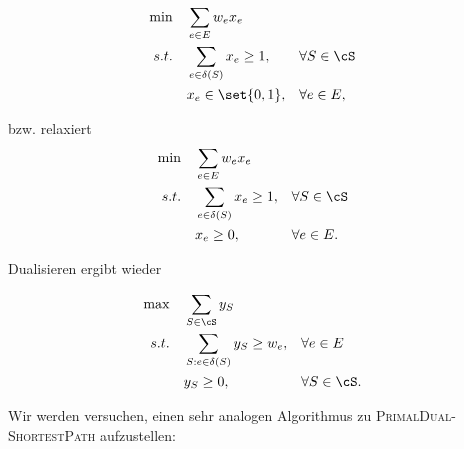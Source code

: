 \documentclass[language=ngerman,algolist]{TemplateLecture}
\begin{document}
\begin{equation*}
    \begin{aligned}
        \min \quad & \sum_{e \in E} w_e x_e \\
        s.t. \quad & \sum_{e \in \delta(S)} x_e \geq 1, && \forall S \in \cS \\
        & x_e \in \set{0,1}, && \forall e \in E,
    \end{aligned}
\end{equation*}

bzw. relaxiert 
\begin{equation}
    \begin{aligned}
        \min \quad & \sum_{e \in E} w_e x_e \\
        s.t. \quad & \sum_{e \in \delta(S)} x_e \geq 1, && \forall S \in \cS \\
        & x_e \geq 0, && \forall e \in E.
    \end{aligned}\label{eq:steinerForestPrimal}
\end{equation}

Dualisieren ergibt wieder

\begin{equation}
    \begin{aligned}
        \max \quad & \sum_{S \in \cS} y_S \\
        s.t. \quad & \sum_{S: e \in \delta(S)} y_S \geq w_e, && \forall e \in E \\
        & y_S \geq 0, && \forall S \in \cS.
    \end{aligned}\label{eq:steinerForestDual}
\end{equation}

Wir werden versuchen, einen sehr analogen Algorithmus zu \textsc{PrimalDual-ShortestPath} aufzustellen:

\begin{algorithm}[h]
    \caption{\textsc{PrimalDual-SteinerForest1}}\label{alg:primalDualSteinerForest1}
    \begin{algorithmic}[1]
         
        \EndWhile{}
    \end{algorithmic}    
\end{algorithm}
\end{document}
